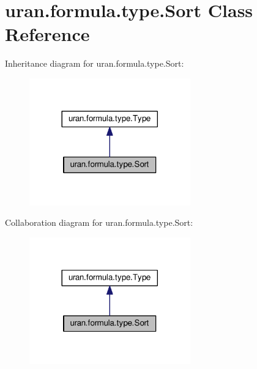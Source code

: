 \hypertarget{classuran_1_1formula_1_1type_1_1_sort}{}\section{uran.\+formula.\+type.\+Sort Class Reference}
\label{classuran_1_1formula_1_1type_1_1_sort}


Inheritance diagram for uran.\+formula.\+type.\+Sort\+:
\nopagebreak
\begin{figure}[H]
\begin{center}
\leavevmode
\includegraphics[width=197pt]{classuran_1_1formula_1_1type_1_1_sort__inherit__graph}
\end{center}
\end{figure}


Collaboration diagram for uran.\+formula.\+type.\+Sort\+:
\nopagebreak
\begin{figure}[H]
\begin{center}
\leavevmode
\includegraphics[width=197pt]{classuran_1_1formula_1_1type_1_1_sort__coll__graph}
\end{center}
\end{figure}

